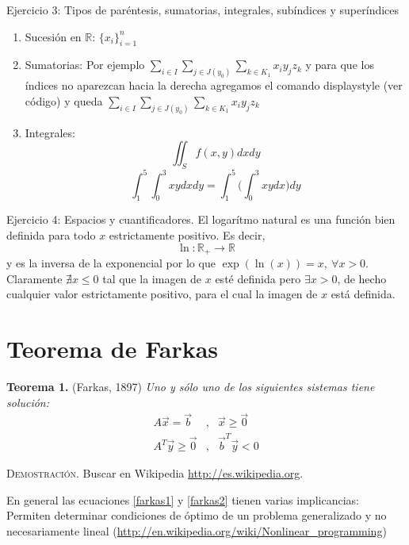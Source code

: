 \documentclass[10pt,a4paper]{article}
\begin{document}
Ejercicio 3: Tipos de par\'entesis, sumatorias, integrales, sub\'indices y super\'indices
\begin{enumerate}
\item Sucesi\'on en $\mathbb{R}$: $\{x_i\}_{i=1}^n$
\item Sumatorias: Por ejemplo $\sum_{i\in I} \sum_{j\in J(y_0)} \sum_{k\in K_1} x_i y_j z_k$ y para que los \'indices no aparezcan hacia la derecha agregamos el comando displaystyle (ver c\'odigo) y queda $\displaystyle \sum_{i\in I} \sum_{j\in J(y_0)} \sum_{k\in K_1} x_i y_j z_k$
\item Integrales:
$$\iint_S f(x,y)dxdy$$
$$\int_1^5 \int_ 0^3 xy dxdy = \int_1^5\bigg( \int_0^3 xy dx\bigg)dy$$
\end{enumerate}

Ejercicio 4: Espacios y cuantificadores.\newline
El logar\'itmo natural es una funci\'on bien definida para todo $x$ estrictamente positivo. Es decir,
$$\ln : \mathbb{R}_+ \to \mathbb{R}$$
y es la inversa de la exponencial por lo que $\exp(\ln(x))=x,~\forall x>0$. Claramente $\nexists x \leq 0$ tal que la imagen de $x$ est\'e definida pero $\exists x > 0$, de hecho cualquier valor estrictamente positivo, para el cual la imagen de $x$ est\'a definida.

\section*{Teorema de Farkas}
\textbf{Teorema 1.} \textsf{(Farkas, 1897)} 
\textit{Uno y s\'olo uno de los siguientes sistemas tiene soluci\'on:}
\begin{eqnarray}
A\vec{x}=\vec{b}&,& \vec{x} \geq \vec{0} \label{farkas1} \\
A^T\vec{y} \geq \vec{0}&,&\vec{b}^T \vec{y} <0 \label{farkas2}
\end{eqnarray}

\textsc{Demostraci\'on}. Buscar en Wikipedia {\color{blue} \url{http://es.wikipedia.org}}. 

En general las ecuaciones \eqref{farkas1} y \eqref{farkas2} tienen varias implicancias: Permiten determinar condiciones de \'optimo de un problema generalizado y no necesariamente lineal (\url{http://en.wikipedia.org/wiki/Nonlinear_programming})
\end{document}
